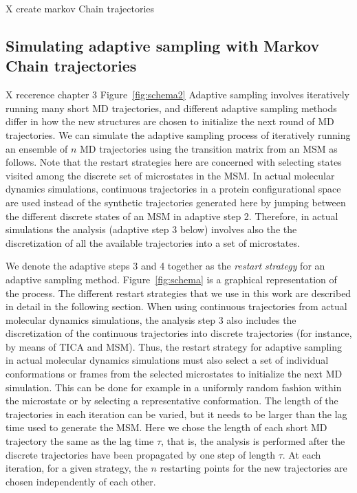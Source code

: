 X create markov Chain trajectories

\subsection{\label{sec:level5}Simulating adaptive sampling with Markov Chain trajectories}
X recerence chapter 3 Figure~\ref{fig:schema2}  
Adaptive sampling involves iteratively running many short MD trajectories, and
different adaptive sampling methods differ in how the new structures are chosen
to initialize the next round of MD trajectories. We can simulate the adaptive
sampling process of iteratively running an ensemble of $n$ MD trajectories 
using the transition matrix from an MSM as follows. 
Note that the restart strategies here are concerned with selecting states
visited among the discrete set of microstates in the MSM. 
In actual molecular dynamics simulations, continuous trajectories in a protein
configurational space are used instead of the synthetic trajectories generated here
by jumping between the different discrete states of an MSM in adaptive step 2.
Therefore, in actual simulations the analysis (adaptive step 3 below) involves also the
the discretization of all the available trajectories into a set of microstates.


We denote the adaptive steps 3 and 4 together as the \emph{restart strategy} for an
adaptive sampling method. Figure~\ref{fig:schema} is a graphical representation
of the process. The different restart strategies that we use in this work are
described in detail in the following section. When using continuous trajectories from actual molecular dynamics simulations,
the analysis step 3 also includes the discretization of the continuous
trajectories into discrete trajectories (for instance, by means of TICA and MSM).
Thus, the restart strategy for adaptive sampling in actual molecular dynamics
simulations must also select a set of individual conformations or frames from the selected
microstates to initialize the next MD simulation. This can be done for example in
a uniformly random fashion within the microstate or by selecting a representative
conformation. 
The length of the trajectories in each iteration can be varied, but it needs to
be larger than the lag time used to generate the MSM.
Here we chose the length of each short MD trajectory the same as the lag time
$\tau$, that is, the analysis is performed after the discrete trajectories have
been propagated by one step of length $\tau$. 
At each iteration, for a given strategy, the $n$ restarting points for the new
trajectories are chosen independently of each other.

